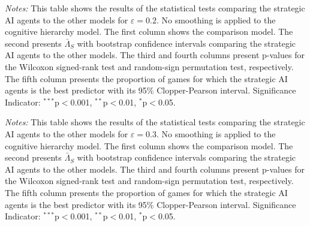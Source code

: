 \documentclass[11pt]{article}
\theoremstyle{definition}
\newcommand{\starlanguage}{Significance Indicator: $^{***}$p$<$0.001, $^{**}$p$<$0.01, $^{*}$p$<$0.05.}
\newcommand{\aisub}{AI agent}
\begin{document}
\begin{table}[h!]
\begin{center}
\caption{Statistical tests comparing optimized vs other models ($\varepsilon = 0.2$)} \label{tab:stat_bounds_20}
\scriptsize

\end{center}
\begin{footnotesize}
\begin{singlespace}
\vspace*{-0.05in}
\emph{Notes:} This table shows the results of the statistical tests comparing the strategic \aisub{s} to the other models for $\varepsilon = 0.2$.
No smoothing is applied to the cognitive hierarchy model.
The first column shows the comparison model.
The second presents $\bar \Lambda_S$ with bootstrap confidence intervals comparing the strategic \aisub{s} to the other models.
The third and fourth columns present p-values for the Wilcoxon signed-rank test and random-sign permutation test, respectively.
The fifth column presents the proportion of games for which the strategic \aisub{s} is the best predictor with its 95\% Clopper-Pearson interval. \starlanguage
\end{singlespace}
\end{footnotesize}
\end{table}

\begin{table}[h!]
\begin{center}
\caption{Statistical tests comparing optimized vs other models ($\varepsilon = 0.3$)} \label{tab:stat_bounds_30}
\scriptsize

\end{center}
\begin{footnotesize}
\begin{singlespace}
\vspace*{-0.05in}
\emph{Notes:} This table shows the results of the statistical tests comparing the strategic \aisub{s} to the other models for $\varepsilon = 0.3$.
No smoothing is applied to the cognitive hierarchy model.
The first column shows the comparison model.
The second presents $\bar \Lambda_S$ with bootstrap confidence intervals comparing the strategic \aisub{s} to the other models.
The third and fourth columns present p-values for the Wilcoxon signed-rank test and random-sign permutation test, respectively.
The fifth column presents the proportion of games for which the strategic \aisub{s} is the best predictor with its 95\% Clopper-Pearson interval. \starlanguage
\end{singlespace}
\end{footnotesize}
\end{table}
\end{document}
